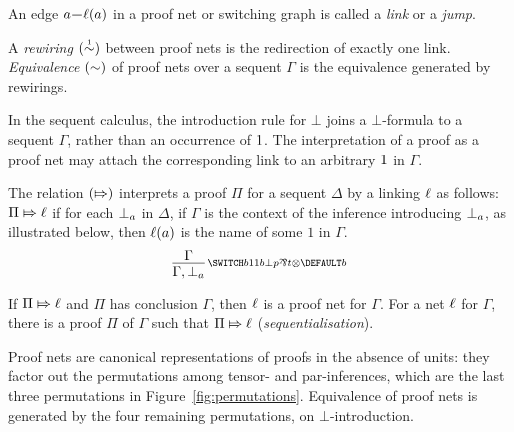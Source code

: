 \documentclass{sigplanconf-modified}
\begin{document}
\noindent
An edge $\edge a{\links(a)}$ in a proof net or switching graph is called a \emph{link} or a \emph{jump}.
%


\begin{definition}
\label{def:proof net equivalence}
%
A \emph{rewiring} $(\perm*)$ between proof nets is the redirection of exactly one link.
%
\emph{Equivalence} $(\perm)$ of proof nets over a sequent $\Gamma$ is the equivalence generated by rewirings.
%
\end{definition}


\noindent
In the sequent calculus, the introduction rule for $\bot$ joins a $\bot$-formula to a sequent $\Gamma$, rather than an occurrence of $1$.
%
The interpretation of a proof as a proof net may attach the corresponding link to an arbitrary $1$ in $\Gamma$.


\begin{definition}
\label{def:proofs to nets}
%
The relation $(\Mapsto)$ interprets a proof $\Pi$ for a sequent $\Delta$ by a linking $\ell$ as follows:
% 
$\Pi\Mapsto\ell$ if for each $\bot_{a}$ in $\Delta$, if $\Gamma$ is the context of the inference introducing $\bot_{a}$, as illustrated below, then $\ell(a)$ is the name of some $1$ in $\Gamma$.
\[
	\infer[\MLLlabel b]{\Gamma,\named a\bot}{\Gamma}
\]
%
\end{definition}



\begin{proposition}
\label{prop:correctness and sequentialisation}
%
%
If $\Pi\Mapsto\ell$ and $\Pi$ has conclusion $\Gamma$, then $\ell$ is a proof net for $\Gamma$.
%
For a net $\ell$ for $\Gamma$, there is a proof $\Pi$ of $\Gamma$ such that $\Pi\Mapsto\ell$ (\emph{sequentialisation}).
%
\end{proposition}


\noindent
Proof nets are canonical representations of proofs in the absence of units: they factor out the permutations among tensor- and par-inferences, which are the last three permutations in Figure~\ref{fig:permutations}.
%
Equivalence of proof nets is generated by the four remaining permutations, on $\bot$-introduction.
\end{document}
